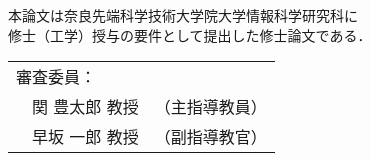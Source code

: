 \renewcommand\thepage{Title2}
\thispagestyle{empty}
\vspace*{8cm}
\begin{center}
本論文は奈良先端科学技術大学院大学情報科学研究科に$\ $ \\
修士（工学）授与の要件として提出した修士論文である．

 \bigskip

 \jauthor
 \vspace*{0.4cm}
 \begin{table}[h]
 \begin{center}
	\begin{tabular}[t]{p{}ll}
	 \multicolumn{2}{l}{審査委員：} \\
	 & 関 豊太郎 教授 & （主指導教員） \\
	 & 早坂 一郎 教授 & （副指導教官）
	\end{tabular}
 \end{center}
 \end{table}
 \end{center}